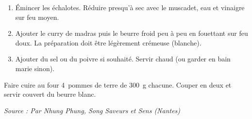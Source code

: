 
\begin{ingredients}
\end{ingredients}


\begin{recipe}
  \begin{enumerate}

  \item Émincer les échalotes.  Réduire presqu'à sec avec le muscadet,
    eau et vinaigre sur feu moyen.

  \item Ajouter le curry de madras puis le beurre froid peu à peu en
    fouettant sur feu doux.  La préparation doit être légèrement
    crémeuse (blanche).

  \item Ajouter du sel ou du poivre si souhaité.  Servir chaud (ou
    garder en bain marie sinon).

  \end{enumerate}
\end{recipe}

\bigskip Faire cuire au four 4~pommes de terre de 300~g chacune.
Couper en deux et servir couvert du beurre blanc.

\bigskip
\textit{Source : Par Nhung Phung, Song Saveurs et Sens (Nantes)}

